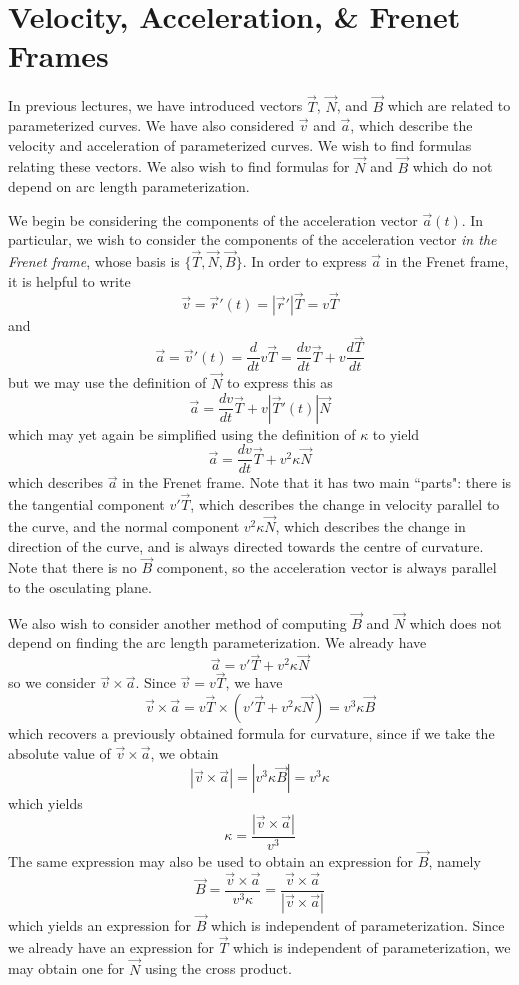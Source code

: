 \documentclass[../main.tex]{subfiles}
\begin{document}
        \section{Velocity, Acceleration, \& Frenet Frames}
        In previous lectures, we have introduced vectors \(\vec{T}\), \(\vec{N}\), and \(\vec{B}\) which are related to parameterized curves. We have also considered \(\vec{v}\) and \(\vec{a}\), which describe the velocity and acceleration of parameterized curves. We wish to find formulas relating these vectors. We also wish to find formulas for \(\vec{N}\) and \(\vec{B}\) which do not depend on arc length parameterization.

        We begin be considering the components of the acceleration vector \(\vec{a}(t)\). In particular, we wish to consider the components of the acceleration vector \emph{in the Frenet frame}, whose basis is \(\{\vec{T},\vec{N},\vec{B}\}\). In order to express \(\vec{a}\) in the Frenet frame, it is helpful to write
        \[
        \vec{v}=\vec{r}'(t)=|\vec{r}'|\vec{T}=v\vec{T}
        \]
        and
        \[
        \vec{a}=\vec{v}'(t)=\frac{d}{dt}v\vec{T}=\frac{dv}{dt}\vec{T}+v\frac{d\vec{T}}{dt}
        \]
        but we may use the definition of \(\vec{N}\) to express this as
        \[
        \vec{a}=\frac{dv}{dt}\vec{T}+v|\vec{T}'(t)|\vec{N}
        \]
        which may yet again be simplified using the definition of \(\kappa\) to yield
        \[
        \vec{a}=\frac{dv}{dt}\vec{T}+v^2\kappa\vec{N}
        \]
        which describes \(\vec{a}\) in the Frenet frame. Note that it has two main ``parts": there is the tangential component \(v'\vec{T}\), which describes the change in velocity parallel to the curve, and the normal component \(v^2\kappa\vec{N}\), which describes the change in direction of the curve, and is always directed towards the centre of curvature. Note that there is no \(\vec{B}\) component, so the acceleration vector is always parallel to the osculating plane.

        We also wish to consider another method of computing \(\vec{B}\) and \(\vec{N}\) which does not depend on finding the arc length parameterization. We already have
        \[
        \vec{a}=v'\vec{T}+v^2\kappa\vec{N}
        \]
        so we consider \(\vec{v}\times\vec{a}\). Since \(\vec{v}=v\vec{T}\), we have
        \[
        \vec{v}\times\vec{a}=v\vec{T}\times(v'\vec{T}+v^2\kappa\vec{N})=v^3\kappa\vec{B}
        \]
        which recovers a previously obtained formula for curvature, since if we take the absolute value of \(\vec{v}\times\vec{a}\), we obtain
        \[
        |\vec{v}\times\vec{a}|=|v^3\kappa\vec{B}|=v^3\kappa
        \]
        which yields
        \[
        \kappa=\frac{|\vec{v}\times\vec{a}|}{v^3}
        \]
        The same expression may also be used to obtain an expression for \(\vec{B}\), namely
        \[
        \vec{B}=\frac{\vec{v}\times\vec{a}}{v^3\kappa}=\frac{\vec{v}\times\vec{a}}{|\vec{v}\times\vec{a}|}
        \]
        which yields an expression for \(\vec{B}\) which is independent of parameterization. Since we already have an expression for \(\vec{T}\) which is independent of parameterization, we may obtain one for \(\vec{N}\) using the cross product.
\end{document}
